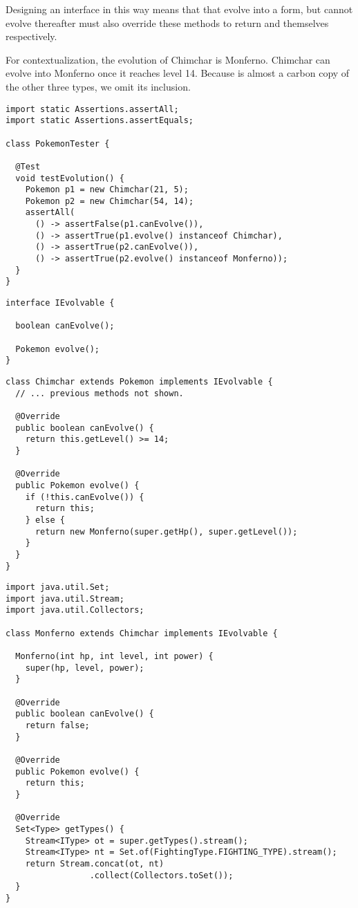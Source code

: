 Designing an interface in this way means that  that evolve into a form, but cannot evolve thereafter must also override these methods to return  and themselves respectively.

For contextualization, the evolution of Chimchar is Monferno. Chimchar can evolve into Monferno once it reaches level 14. Because  is almost a carbon copy of the other three types, we omit its inclusion.

\begin{lstlisting}[language=MyJava]
import static Assertions.assertAll;
import static Assertions.assertEquals;

class PokemonTester {

  @Test 
  void testEvolution() {
    Pokemon p1 = new Chimchar(21, 5);
    Pokemon p2 = new Chimchar(54, 14);
    assertAll(
      () -> assertFalse(p1.canEvolve()),
      () -> assertTrue(p1.evolve() instanceof Chimchar),
      () -> assertTrue(p2.canEvolve()),
      () -> assertTrue(p2.evolve() instanceof Monferno));
  }
}
\end{lstlisting}

\begin{lstlisting}[language=MyJava]
interface IEvolvable {

  boolean canEvolve();

  Pokemon evolve();
}
\end{lstlisting}

\begin{lstlisting}[language=MyJava]
class Chimchar extends Pokemon implements IEvolvable {
  // ... previous methods not shown.

  @Override
  public boolean canEvolve() {
    return this.getLevel() >= 14;
  }

  @Override
  public Pokemon evolve() {
    if (!this.canEvolve()) {
      return this;
    } else {
      return new Monferno(super.getHp(), super.getLevel());
    }
  }
}
\end{lstlisting}

\begin{lstlisting}[language=MyJava]
import java.util.Set;
import java.util.Stream;
import java.util.Collectors;

class Monferno extends Chimchar implements IEvolvable {

  Monferno(int hp, int level, int power) {
    super(hp, level, power);
  }

  @Override 
  public boolean canEvolve() {
    return false;
  }

  @Override
  public Pokemon evolve() {
    return this;
  }

  @Override
  Set<Type> getTypes() {
    Stream<IType> ot = super.getTypes().stream();
    Stream<IType> nt = Set.of(FightingType.FIGHTING_TYPE).stream();
    return Stream.concat(ot, nt)
                 .collect(Collectors.toSet());
  }
}
\end{lstlisting}


